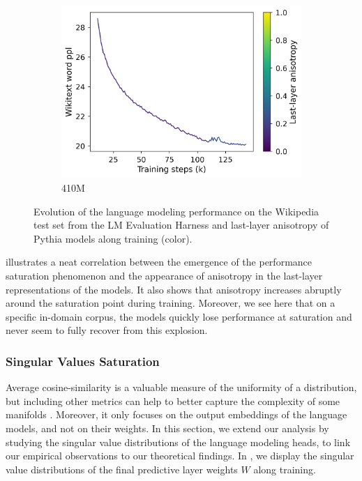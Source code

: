 \begin{figure}[h]
\begin{subfigure}{0.33\columnwidth}
         \includegraphics[width=\linewidth]{sources/part_1/softmax_bottleneck/imgs/anisotropy_explosion_410m.png}
         \caption{410M}
         \label{fig:410M}
    \end{subfigure}
    \caption{Evolution of the language modeling performance on the Wikipedia test set from the LM Evaluation Harness \citep{eval-harness} and last-layer anisotropy of Pythia models along training (color).}
    \label{fig:aniso_v_saturation}
\end{figure}

 illustrates a neat correlation between the emergence of the performance saturation phenomenon and the appearance of anisotropy in the last-layer representations of the models. It also shows that anisotropy increases abruptly around the saturation point during training. Moreover, we see here that on a specific in-domain corpus, the models quickly lose performance at saturation and never seem to fully recover from this explosion.

\subsubsection{Singular Values Saturation}
\label{sub:saturation}

Average cosine-similarity is a valuable measure of the uniformity of a distribution, but including other metrics can help to better capture the complexity of some manifolds \citep{rudman-etal-2022-isoscore}. Moreover, it only focuses on the output embeddings of the language models, and not on their weights. In this section, we extend our analysis by studying the singular value distributions of the language modeling heads, to link our empirical observations to our theoretical findings. In , we display the singular value distributions of the final predictive layer weights $W$ along training.

